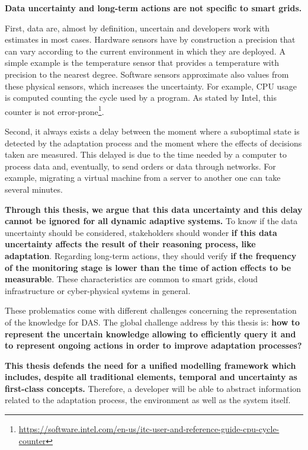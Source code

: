 \bigskip
{}
\textbf{Data uncertainty and long-term actions are not specific to smart grids.}

First, data are, almost by definition, uncertain and developers work with estimates in most cases.
Hardware sensors have by construction a precision that can vary according to the current environment in which they are deployed.
A simple example is the temperature sensor that provides a temperature with precision to the nearest degree.
Software sensors approximate also values from these physical sensors, which increases the uncertainty.
For example, CPU usage is computed counting the cycle used by a program.
As stated by Intel, this counter is not error-prone\footnote{\url{https://software.intel.com/en-us/itc-user-and-reference-guide-cpu-cycle-counter}}.

Second, it always exists a delay between the moment where a suboptimal state is detected by the adaptation process and the moment where the effects of decisions taken are measured.
This delayed is due to the time needed by a computer to process data and, eventually, to send orders or data through networks.
For example, migrating a virtual machine from a server to another one can take several minutes.

\textbf{Through this thesis, we argue that this data uncertainty and this delay cannot be ignored for all dynamic adaptive systems.}
To know if the data uncertainty should be considered, stakeholders should wonder \textbf{if this data uncertainty affects the result of their reasoning process, like adaptation}.
Regarding long-term actions, they should verify \textbf{if the frequency of the monitoring stage is lower than the time of action effects to be measurable}.
These characteristics are common to smart grids, cloud infrastructure or cyber-physical systems in general.

\bigskip
{}
These problematics come with different challenges concerning the representation of the knowledge for DAS.
The global challenge address by this thesis is: \textbf{how to represent the uncertain knowledge allowing to efficiently query it and to represent ongoing actions in order to improve adaptation processes?}

\bigskip
{}
\textbf{This thesis defends the need for a unified modelling framework which includes, despite all traditional elements, temporal and uncertainty as first-class concepts.}
Therefore, a developer will be able to abstract information related to the adaptation process, the environment as well as the system itself.

